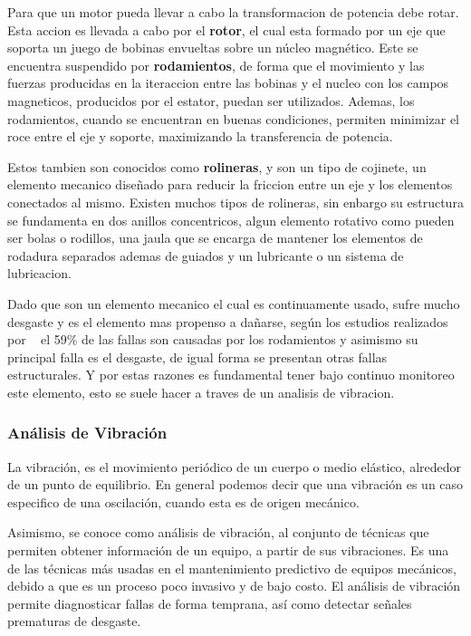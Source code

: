 Para que un motor pueda llevar a cabo la transformacion de potencia debe rotar.
Esta accion es llevada a cabo por el \textbf{rotor}, el cual esta formado por un
eje que soporta un juego de bobinas envueltas sobre un núcleo magnético. Este
se encuentra suspendido por \textbf{rodamientos}, de forma que el movimiento y
las fuerzas producidas en la iteraccion entre las bobinas y el nucleo con los
campos magneticos, producidos por el estator, puedan ser utilizados. Ademas,
los rodamientos, cuando se encuentran en buenas condiciones, permiten minimizar
el roce entre el eje y soporte, maximizando la transferencia de potencia.

Estos tambien son conocidos como \textbf{rolineras}, y son un tipo de cojinete,
un elemento mecanico diseñado para reducir la friccion entre un eje y los
elementos conectados al mismo. Existen muchos tipos de rolineras, sin enbargo
su estructura se fundamenta en dos anillos concentricos, algun elemento rotativo
como pueden ser bolas o rodillos, una jaula que se encarga de mantener los
elementos de rodadura separados ademas de guiados y un lubricante o un sistema
de lubricacion.

Dado que son un elemento mecanico el cual es continuamente usado, sufre mucho
desgaste y es el elemento mas propenso a dañarse, según los estudios realizados
por ~\textcite{Kammermann} el 59\% de las fallas son causadas por los rodamientos
y asimismo su principal falla es el desgaste, de igual forma se presentan
otras fallas estructurales. Y por estas razones es fundamental tener bajo continuo
monitoreo este elemento, esto se suele hacer a traves de un analisis de vibracion.


\subsubsection{Análisis de Vibración}

La vibración, es el  movimiento periódico de un cuerpo o medio
elástico, alrededor de un punto de equilibrio. En general podemos decir que una
vibración es un caso especifico de una oscilación, cuando esta es de origen
mecánico.

Asimismo, se conoce como análisis de vibración, al conjunto de técnicas que permiten
obtener información de un equipo, a partir de sus vibraciones. Es una de las
técnicas más usadas en el mantenimiento predictivo de equipos mecánicos, debido
a que es un proceso poco invasivo y de bajo costo. El análisis de vibración
permite diagnosticar fallas de forma temprana, así como detectar señales
prematuras de desgaste.


